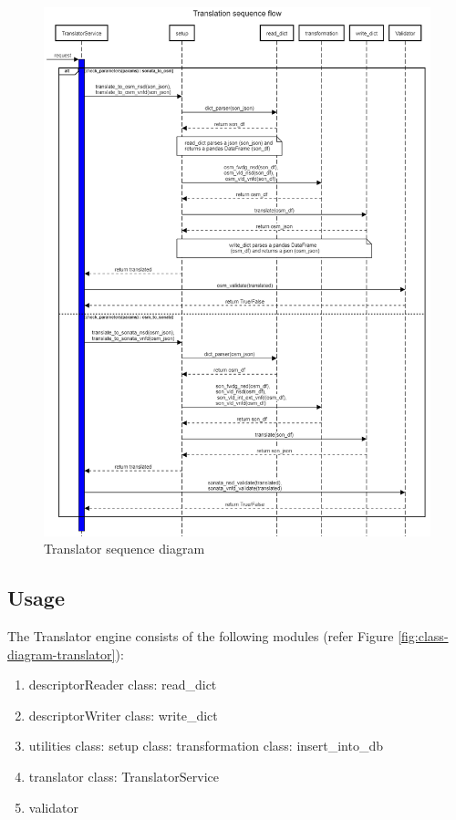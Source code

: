 \begin{figure}[h!]
	\centering
	\includegraphics[width=1\linewidth]{"figures/translator_seq_diag"}
	\caption{Translator sequence diagram}
	\label{fig:sequence-diagram-translator}
\end{figure}


\subsection{Usage}
The Translator engine consists of the following modules (refer Figure  \ref{fig:class-diagram-translator}):
\begin{enumerate}
	\item descriptorReader
	\subitem class: read\_dict
	\item descriptorWriter
	\subitem class: write\_dict
	\item utilities
	\subitem class: setup
	\subitem class: transformation
	\subitem class: insert\_into\_db
	\item translator
	\subitem class: TranslatorService
	\item validator
	
\end{enumerate}

